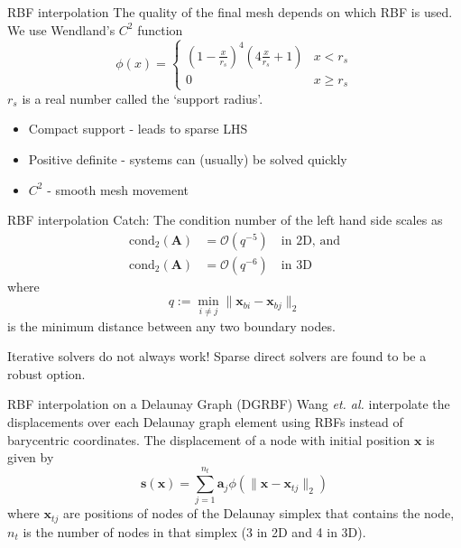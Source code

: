 \documentclass[t,12pt]{beamer}
\let\bld\boldsymbol
\begin{document}
\begin{frame}{RBF interpolation}
The quality of the final mesh depends on which RBF is used. We use Wendland's $C^2$ function 
\begin{equation}
\phi(x) = 
\begin{cases}
\left(1-\frac{x}{r_s}\right)^4\left(4\frac{x}{r_s} + 1\right) & x < r_s \\
0 & x \geq r_s
\end{cases}
\end{equation}
$r_s$ is a real number called the `support radius'.
\begin{itemize}
	\item Compact support - leads to sparse LHS
	\item Positive definite - systems can (usually) be solved quickly
	\item $C^2$ - smooth mesh movement
\end{itemize}
\end{frame}

\begin{frame}{RBF interpolation}
Catch: The condition number of the left hand side scales as
\begin{equation}
\begin{aligned}
\text{cond}_2 (\bld{A}) &= \mathcal{O}(q^{-5}) \quad \text{in 2D, and} \\
\text{cond}_2 (\bld{A}) &= \mathcal{O}(q^{-6}) \quad \text{in 3D}
\end{aligned}
\end{equation}
where
\begin{equation}
q := \min_{i\neq j} \lVert \bld{x}_{bi} - \bld{x}_{bj} \rVert_2
\end{equation}
is the minimum distance between any two boundary nodes.

Iterative solvers do not always work! Sparse direct solvers are found to be a robust option.
\end{frame}

\begin{frame}{RBF interpolation on a Delaunay Graph (DGRBF)}
Wang \emph{et. al.}  interpolate the displacements over each Delaunay graph element  using RBFs instead of barycentric coordinates.
The displacement of a node with initial position $\bld{x}$ is given by
\begin{equation}
\mathbf{s}(\mathbf{x}) = \sum_{j=1}^{n_t} \mathbf{a}_j \phi(\lVert\mathbf{x} - \mathbf{x}_{tj}\rVert_2)
\label{eqn:dgrbf}
\end{equation}
where $\bld{x}_{tj}$ are positions of nodes of the Delaunay simplex that contains the node, $n_t$ is the number of nodes in that simplex (3 in 2D and 4 in 3D). 
\end{frame}
\end{document}
